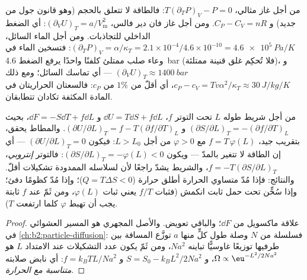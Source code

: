 \begin{example}\label{ex:b2:thermodynamic-potentials:reveal}
من أجل غاز مثالي، $T(\partial_TP)_V - P = 0$: فالطاقة لا تتعلق
بالحجم (وهو قانون جول من جديد) و $C_P - C_V = nR$. ومن أجل غاز فان
دير فالس، $(\partial_VU)_T = a/V_{\text{m}}^2$: أي الضغط الداخلي
للتجاذبات. ومن أجل الماء السائل، $(\partial_TP)_V = \alpha/\kappa_T = 2.1
\times 10^{-4}/4.6 \times 10^{-10} = \qty{4.6e5}{Pa/K}$: فتسخين الماء في
وعاء صلب ممتلئ كلفنًا واحدًا يرفع الضغط \qty{4.6}{bar}
(فلا تُحكِم غلق قنينة ممتلئة)، و $(\partial_VU)_T \approx \qty{1400}{bar}$ ---
أي تماسك السائل؛ ومع ذلك $c_P - c_V = Tv\alpha^2/\kappa_T \approx
\qty{30}{J/kg/K}$، أي أقلّ من $1\%$ من $c_P$: فالسعتان الحراريتان في
المادة المكثفة تكادان تتطابقان.
\end{example}

\begin{proposition}\label{prop:b2:thermodynamic-potentials:rubber}
من أجل شريط طوله $L$ تحت التوتر $f$، $\dd U = T\dd S + f\dd L$
و $\dd F = -S\dd T + f\dd L$، بحيث $(\partial S/\partial L)_T =
-(\partial f/\partial T)_L$ و $(\partial U/\partial L)_T = f - T(\partial f/
\partial T)_L$. والمطاط يحقق، بتقريب جيد، $f = T\,\varphi(L)$
مع $\varphi > 0$ من أجل $L > L_0$: فيكون $(\partial U/\partial L)_T = 0$ --- أي إن
الطاقة لا تتغير بالمدّ --- ويكون $(\partial S/\partial L)_T =
-\varphi(L) < 0$: فالتوتر \emph{إنتروبي}، $f = -T(\partial S/\partial
L)_T$، والشريط يشدّ راجعًا لأن لسلاسله الممدودة تشكيلات
أقلّ. والنتائج: فإذا مُدّ متساوي الحرارة أطلق حرارة
($Q = T\Delta S < 0$)؛ وإذا مُدّ كظومًا دفئ؛ وإذا سُخِّن تحت
حمل ثابت انكمش (فثبات $f/T$ يعني ثبات $\varphi(L)$، ومن ثَمّ عند
$f$ ثابتة يجب أن تهبط $\varphi$ كلما ارتفعت $T$).
\end{proposition}

\begin{proof}
علاقة ماكسويل من $\dd F$؛ والباقي تعويض. والأصل
المجهري هو المسير العشوائي في \cref{ch:b2:particle-diffusion}:
فسلسلة من $N$ وصلة طول كلٍّ منها $a$ توزَّع المسافة بين طرفيها
توزيعًا غاوسيًّا تباينه $Na^2$، ومن ثَمّ يكون عدد
التشكيلات عند الامتداد $L$ هو $\Omega \propto \eu^{-L^2/2Na^2}$، و $S = S_0 -
k_BL^2/2Na^2$ و $f = k_BTL/Na^2$: أي نابض صلابته
\emph{متناسبة مع الحرارة}.
\end{proof}

